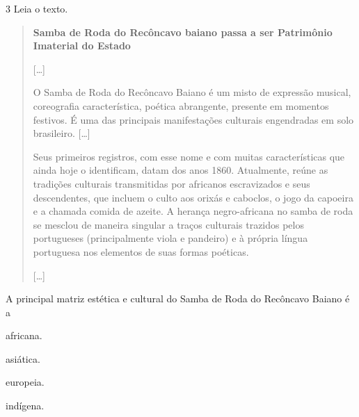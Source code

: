 
\pagebreak
\num{3}  Leia o texto.

\begin{quote}
\textbf{Samba de Roda do Recôncavo baiano passa a ser Patrimônio Imaterial do Estado}

{[}\ldots{}{]}

O Samba de Roda do Recôncavo Baiano é um misto de expressão musical,
coreografia característica, poética abrangente, presente em momentos
festivos. É uma das principais manifestações culturais engendradas em
solo brasileiro. {[}\ldots{}{]}

Seus primeiros registros, com esse nome e com muitas características que
ainda hoje o identificam, datam dos anos 1860. Atualmente, reúne as
tradições culturais transmitidas por africanos escravizados e seus
descendentes, que incluem o culto aos orixás e caboclos, o jogo da
capoeira e a chamada comida de azeite. A herança negro-africana no samba
de roda se mesclou de maneira singular a traços culturais trazidos pelos
portugueses (principalmente viola e pandeiro) e à própria língua
portuguesa nos elementos de suas formas poéticas.

{[}\ldots{}{]}

\end{quote}

A principal matriz estética e cultural do Samba de Roda do Recôncavo Baiano é a

\begin{minipage}{.5\textwidth}
\begin{escolha}
\item
  africana.
\item
  asiática.
\item
  europeia.
\item
  indígena.
\end{escolha}
\end{minipage}

